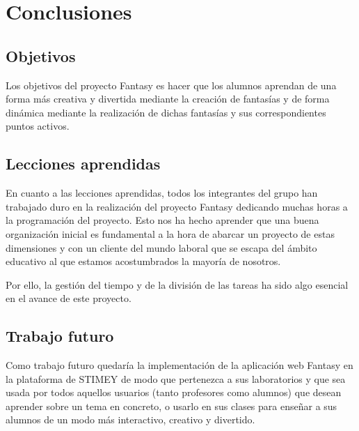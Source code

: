 \chapter{Conclusiones}
\section{Objetivos}
Los objetivos del proyecto Fantasy es hacer que los alumnos aprendan de una forma más creativa y divertida mediante la creación de fantasías y de forma dinámica mediante la realización de dichas fantasías y sus correspondientes puntos activos.

\section{Lecciones aprendidas}
En cuanto a las lecciones aprendidas, todos los integrantes del grupo han trabajado duro en la realización del proyecto Fantasy dedicando muchas horas a la programación del proyecto. Esto nos ha hecho aprender que una buena organización inicial es fundamental a la hora de abarcar un proyecto de estas dimensiones y con un cliente del mundo laboral que se escapa del ámbito educativo al que estamos acostumbrados la mayoría de nosotros.

Por ello, la gestión del tiempo y de la división de las tareas ha sido algo esencial en el avance de este proyecto.

\section{Trabajo futuro}
Como trabajo futuro quedaría la implementación de la aplicación web Fantasy en la plataforma de STIMEY de modo que pertenezca a sus laboratorios y que sea usada por todos aquellos usuarios (tanto profesores como alumnos) que desean aprender sobre un tema en concreto, o usarlo en sus clases para enseñar a sus alumnos de un modo más interactivo, creativo y divertido.